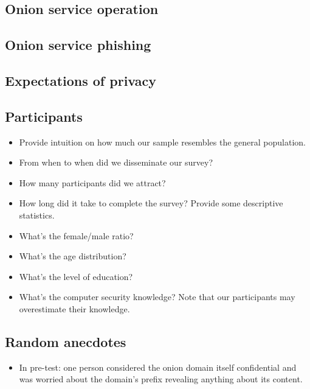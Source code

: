 \subsection{Onion service operation}
\subsection{Onion service phishing}
\subsection{Expectations of privacy}

\subsection{Participants}
\begin{itemize}
    \item Provide intuition on how much our sample resembles the general
        population.
    \item From when to when did we disseminate our survey?
    \item How many participants did we attract?
    \item How long did it take to complete the survey?  Provide some descriptive statistics.
    \item What's the female/male ratio?
    \item What's the age distribution?
    \item What's the level of education?
    \item What's the computer security knowledge?  Note that our participants
        may overestimate their knowledge.
\end{itemize}

\subsection{Random anecdotes}
\begin{itemize}
    \item In pre-test: one person considered the onion domain itself
        confidential and was worried about the domain's prefix revealing
        anything about its content.
\end{itemize}
